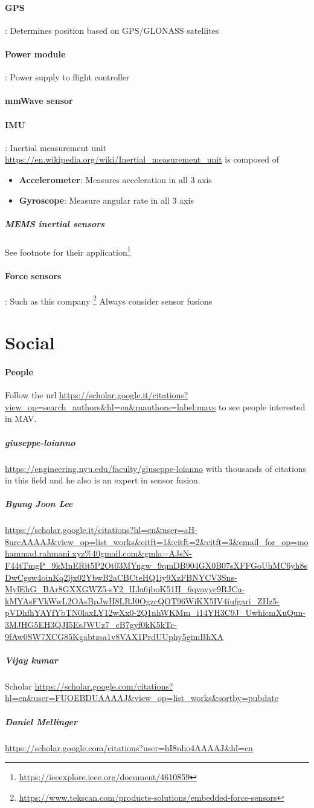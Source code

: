 \documentclass{article}
\begin{document}
			\paragraph{GPS}: Determines position based on GPS/GLONASS satellites
			\paragraph{Power module}: Power supply to flight controller
			\paragraph{mmWave sensor}
			\paragraph{IMU}: Inertial measurement unit \url{https://en.wikipedia.org/wiki/Inertial_measurement_unit}
				is composed of 
				\begin{itemize}
					\item \textbf{Accelerometer}: Measures acceleration in all 3 axis
					\item \textbf{Gyroscope}: Measure angular rate in all 3 axis
				\end{itemize}
				\subparagraph{MEMS inertial sensors}
				See footnote for their application\footnote{\url{https://ieeexplore.ieee.org/document/4610859}}
			\paragraph{Force sensors}: Such as this company \footnote{\url{https://www.tekscan.com/products-solutions/embedded-force-sensors}}
		Always consider sensor fusions
	\section{Social}
		\paragraph{People}
		Follow the url \url{https://scholar.google.it/citations?view_op=search_authors\&hl=en\&mauthors=label:mavs} to see people interested in MAV. 
			\subparagraph{giuseppe-loianno} \url{https://engineering.nyu.edu/faculty/giuseppe-loianno} with thousands of citations in this field and he also is an expert in sensor fusion.
			\subparagraph{Byung Joon Lee} \url{https://scholar.google.it/citations?hl=en\&user=aH-8urcAAAAJ\&view_op=list_works\&citft=1\&citft=2\&citft=3\&email_for_op=mohammad.rahmani.xyz%40gmail.com&gmla=AJsN-F44tTmgP_9kMnERit5P2Ot03MYngw_9qmDB904GX0B07sXFFGoUhMC6yh8sDwCgsw4oinKq2ljx02YbwB2aCBCteHQ1iy9XzFBNYCV3Sns-MylEhG_BAr8GXXGWZ5-sY2_lLla6jboK51H_6qvayyc9RJCa-kMYAsFVkWwL2OAsBpJwH8LRJ0OgzcQOT96WiKX5IV4iufgari_ZHz5-pVDhfhYAYfYbTN0laxLY12wXx0-2Q1nhWKMm_i14YH3C9J_UwhicmXuQun-3MJHG5EH3QJI5EsJWUz7_cB7gyf0kK5kTc-9fAw0SW7XCG85Kgabtzsa1v8VAX1PrdUUphy5gimBhXA}
				
			\subparagraph{Vijay kumar} Scholar \url{https://scholar.google.com/citations?hl=en\&user=FUOEBDUAAAAJ\&view_op=list_works\&sortby=pubdate}
			
			\subparagraph{Daniel Mellinger}
			\url{https://scholar.google.com/citations?user=hI8nho4AAAAJ\&hl=en}
	
\end{document}
